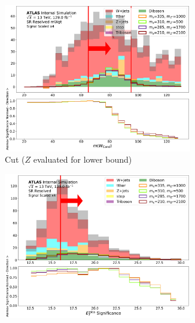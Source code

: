 \begin{figure}[htbp]
\begin{subfigure}[t]{0.48\textwidth}
     \includegraphics[width = 0.9\textwidth]{Figures/5/SR1L_Resolved_mWgt/WCand_m_normSig_N_1.pdf}
     \caption{\Wcandm Cut (\(Z\) evaluated for lower bound)}
    \end{subfigure}
    \begin{subfigure}[t]{0.48\textwidth}
    \centering
     \includegraphics[width = 0.9\textwidth]{Figures/5/SR1L_Resolved/MetTST_Significance_normSig_N_1.pdf}
    \caption{\metsig}
    \end{subfigure}
    \begin{subfigure}[t]{0.48\textwidth}
    \centering

\end{subfigure}
\end{figure}
